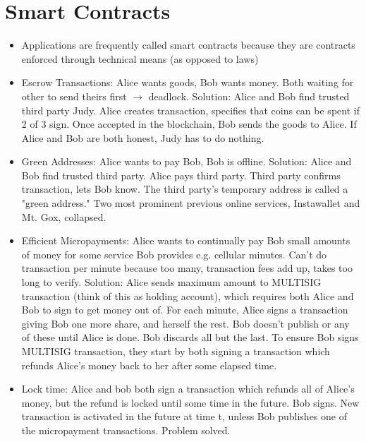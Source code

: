 \documentclass{article}
\begin{document}
\section{Smart Contracts}
\begin{itemize}
\item Applications are frequently called smart contracts because they are contracts enforced through technical means (as opposed to laws)

\item Escrow Transactions: Alice wants goods, Bob wants money. Both waiting for other to send theirs first $\rightarrow$ deadlock. Solution: Alice and Bob find trusted third party Judy. Alice creates transaction, specifies that coins can be spent if 2 of 3 sign. Once accepted in the blockchain, Bob sends the goods to Alice. If Alice and Bob are both honest, Judy has to do nothing.

\item Green Addresses: Alice wants to pay Bob, Bob is offline. Solution: Alice and Bob find trusted third party. Alice pays third party. Third party confirms transaction, lets Bob know. The third party's temporary address is called a "green address." Two most prominent previous online services, Instawallet and Mt. Gox, collapsed.

\item Efficient Micropayments: Alice wants to continually pay Bob small amounts of money for some service Bob provides e.g. cellular minutes. Can't do transaction per minute because too many, transaction fees add up, takes too long to verify. Solution: Alice sends maximum amount to MULTISIG transaction (think of this as holding account), which requires both Alice and Bob to sign to get money out of. For each minute, Alice signs a transaction giving Bob one more share, and herself the rest. Bob doesn't publish or any of these until Alice is done. Bob discards all but the last. To ensure Bob signs MULTISIG transaction, they start by both signing a transaction which refunds Alice's money back to her after some elapsed time.

\item Lock time: Alice and bob both sign a transaction which refunds all of Alice's money, but the refund is locked until some time in the future. Bob signs. New transaction is activated in the future at time t, unless Bob publishes one of the micropayment transactions. Problem solved.
\end{itemize}
\end{document}
